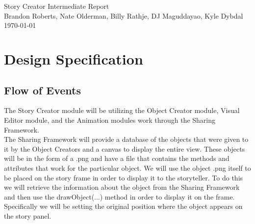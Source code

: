\documentclass[12pt]{article}
\begin{document}

\begin{titlepage}
	\vspace*{\fill} %
	\begin{center}
		{\Huge Story Creator Intermediate Report}\\ [0.5cm]	%
		{\Large Brandon Roberts, Nate Olderman, Billy Rathje, DJ Maguddayao, Kyle Dybdal}\\[0.4cm]
		\today %
	\end{center}
	\vspace*{\fill}
\end{titlepage}

\section{Design Specification}
	\subsection{Flow of Events}
	
The Story Creator module will be utilizing the Object Creator module, Visual Editor module, and the Animation modules work through the Sharing Framework.\\

The Sharing Framework will provide a database of the objects that were given to it by the Object Creators and a canvas to display the entire view.  These objects will be in the form of a .png and have a file that contains the methods and attributes that work for the particular object.  We will use the object .png itself to be placed on the story frame in order to display it to the storyteller.  To do this we will retrieve the information about the object from the Sharing Framework and then use the drawObject(...) method in order to display it on the frame.  Specifically we will be setting the original position where the object appears on the story panel.  \\
\end{document}
